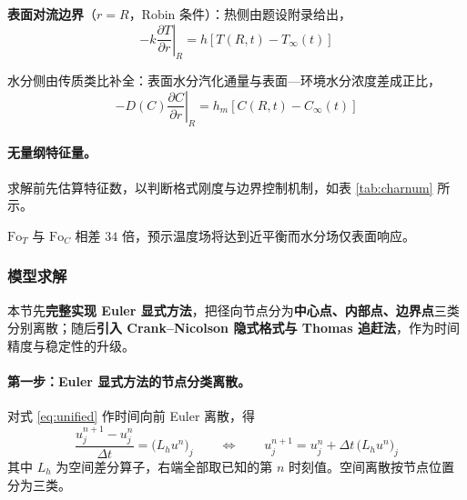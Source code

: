\documentclass[12pt,a4paper]{ctexart}
\begin{document}
\textbf{表面对流边界}（$r=R$，Robin 条件）：热侧由题设附录给出，
\begin{equation}
-k\left.\frac{\partial T}{\partial r}\right|_{R}=h\left[T(R,t)-T_\infty(t)\right]
\label{eq:robinT}
\end{equation}

水分侧由传质类比补全：表面水分汽化通量与表面—环境水分浓度差成正比，
\begin{equation}
-D(C)\left.\frac{\partial C}{\partial r}\right|_{R}=h_m\left[C(R,t)-C_\infty(t)\right]
\label{eq:robinC}
\end{equation}

\paragraph{无量纲特征量。} 求解前先估算特征数，以判断格式刚度与边界控制机制，如表 \ref{tab:charnum} 所示。

\begin{table}[H]
\centering
\caption{无量纲特征量}
\label{tab:charnum}
\end{table}

$\mathrm{Fo}_T$ 与 $\mathrm{Fo}_C$ 相差 $34$ 倍，预示温度场将达到近平衡而水分场仅表面响应。

\subsubsection{模型求解}
本节先\textbf{完整实现 Euler 显式方法}，把径向节点分为\textbf{中心点、内部点、边界点}三类分别离散；随后\textbf{引入 Crank--Nicolson 隐式格式与 Thomas 追赶法}，作为时间精度与稳定性的升级。

\paragraph{第一步：Euler 显式方法的节点分类离散。}
对式 \eqref{eq:unified} 作时间向前 Euler 离散，得
\begin{equation}
\frac{u^{n+1}_j-u^{n}_j}{\Delta t}=\big(L_h u^n\big)_j
\qquad\Longleftrightarrow\qquad
u^{n+1}_j=u^{n}_j+\Delta t\,\big(L_h u^n\big)_j
\label{eq:explicit}
\end{equation}
其中 $L_h$ 为空间差分算子，右端全部取已知的第 $n$ 时刻值。空间离散按节点位置分为三类。
\end{document}
